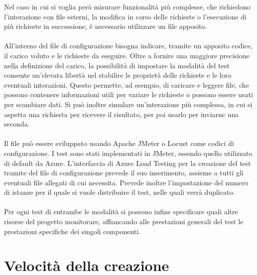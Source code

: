 Nel caso in cui si voglia però misurare funzionalità più complesse, 
che richiedono l'interazione con file esterni, la modifica in corso delle richieste o 
l'esecuzione di più richieste in successione, è necessario utilizzare un file apposito.\\
\\
All'interno del file di configurazione bisogna indicare, tramite un apposito codice,
il carico voluto e le richieste da eseguire.
Oltre a fornire una maggiore precisione nella definizione del carico, 
la possibilità di impostare la modalità del test
consente un'elevata libertà nel stabilire le proprietà delle richieste e le loro eventuali interazioni.
Questo permette, ad esempio, di caricare e leggere file, 
che possono contenere informazioni utili per variare le richieste o
possono essere usati per scambiare dati.
Si può inoltre simulare un'interazione più complessa,
in cui si aspetta una richiesta per ricevere il risultato, 
per poi usarlo per inviarne una seconda.\\
\\
Il file può essere sviluppato usando Apache JMeter o Locust come codici di configurazione.
I test sono stati implementati in JMeter,
essendo quello utilizzato di default da Azure.
L'interfaccia di Azure Load Testing per la creazione del test tramite del file di configurazione
prevede il suo inserimento, assieme a tutti gli eventuali file allegati di cui necessita.
Prevede inoltre l'impostazione del numero di istanze 
per il quale si vuole distribuire il test, nelle quali verrà duplicato.\\
\\
Per ogni test di entrambe le modalità si possono infine specificare quali altre risorse del progetto monitorare,
affiancando alle prestazioni generali del test le prestazioni specifiche dei singoli componenti.
\section{Velocità della creazione}

